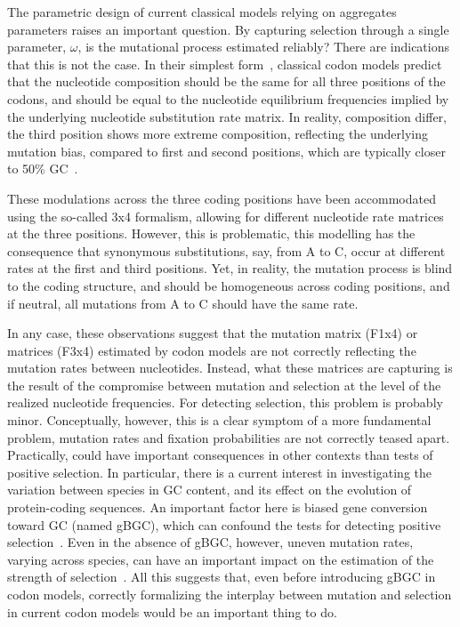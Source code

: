 The parametric design of current classical models relying on aggregates parameters raises an important question.
By capturing selection through a single parameter, $\omega$, is the mutational process estimated reliably?
There are indications that this is not the case.
In their simplest form~\citep{Muse1994}, classical codon models predict that the nucleotide composition should be the same for all three positions of the codons, and should be equal to the nucleotide equilibrium frequencies implied by the underlying nucleotide substitution rate matrix.
In reality, composition differ, the third position shows more extreme composition, reflecting the underlying mutation bias, compared to first and second positions, which are typically closer to 50\% GC~\citep{Singer2000}.

These modulations across the three coding positions have been accommodated using the so-called 3x4 formalism, allowing for different nucleotide rate matrices at the three positions.
However, this is problematic, this modelling has the consequence that synonymous substitutions, say, from A to C, occur at different rates at the first and third positions.
Yet, in reality, the mutation process is blind to the coding structure, and should be homogeneous across coding positions, and if neutral, all mutations from A to C should have the same rate.

In any case, these observations suggest that the mutation matrix (F1x4) or matrices (F3x4) estimated by codon models are not correctly reflecting the mutation rates between nucleotides.
Instead, what these matrices are capturing is the result of the compromise between mutation and selection at the level of the realized nucleotide frequencies.
For detecting selection, this problem is probably minor.
Conceptually, however, this is a clear symptom of a more fundamental problem, mutation rates and fixation probabilities are not correctly teased apart.
Practically, could have important consequences in other contexts than tests of positive selection.
In particular, there is a current interest in investigating the variation between species in GC content, and its effect on the evolution of protein-coding sequences.
An important factor here is biased gene conversion toward GC (named gBGC), which can confound the tests for detecting positive selection~\citep{Galtier2009,Ratnakumar2010, Figuet2014}.
Even in the absence of \acrshort{gBGC}, however, uneven mutation rates, varying across species, can have an important impact on the estimation of the strength of selection~\citep{Galtier2009,Ratnakumar2010, Figuet2014}.
All this suggests that, even before introducing \acrshort{gBGC} in codon models, correctly formalizing the interplay between mutation and selection in current codon models would be an important thing to do.

